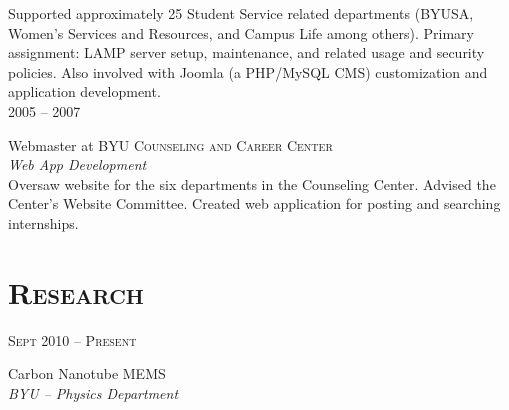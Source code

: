 \documentclass[10pt]{article}
\begin{document}
{\begin{minipage}[t]{0.5\textwidth}
	\normalsize{
  Supported approximately 25 Student Service related departments (BYUSA, Women's Services and Resources, and Campus Life among others). 
  Primary assignment: LAMP server setup, maintenance, and related usage and security policies. 
  Also involved with Joomla (a PHP/MySQL CMS) customization and application development. 
  }\\[10pt]

	\raggedleft
	\textsc{\normalsize 2005 -- 2007}\par

	\raggedright\large Webmaster at \textsc{BYU Counseling and Career Center}\\
	\emph{Web App Development}\\[5pt]

	\normalsize{
  Oversaw website for the six departments in the Counseling Center.
  Advised the Center's Website Committee.
  Created web application for posting and searching internships.
  }\\[10pt]

%	
%
\section{\textsc{Research}}

	\raggedleft
	\textsc{\normalsize Sept 2010 -- Present}\par

	\raggedright\large Carbon Nanotube MEMS\\
	\emph{BYU -- Physics Department}\\[5pt]



\end{minipage}}
\end{document}
